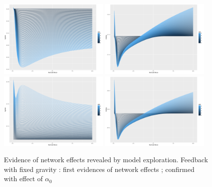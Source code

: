 \documentclass[Royal,sageh,times]{sagej}
\begin{document}
\begin{figure}
\centering
\includegraphics[width=0.48\textwidth]{figures/logmse-feedbackDecay_ZOOM}
\includegraphics[width=0.48\textwidth]{figures/mselog-feedbackDecay_ZOOM}\\
\includegraphics[width=0.48\textwidth]{figures/logmse-feedbackDecay_ZOOM_fixedgravity}
\includegraphics[width=0.48\textwidth]{figures/mselog-feedbackDecay_ZOOM_fixedgravity}
\caption{Evidence of network effects revealed by model exploration. Feedback with fixed gravity : first evidences of network effects ; confirmed with effect of $\alpha_0$}
\end{figure}
\end{document}
